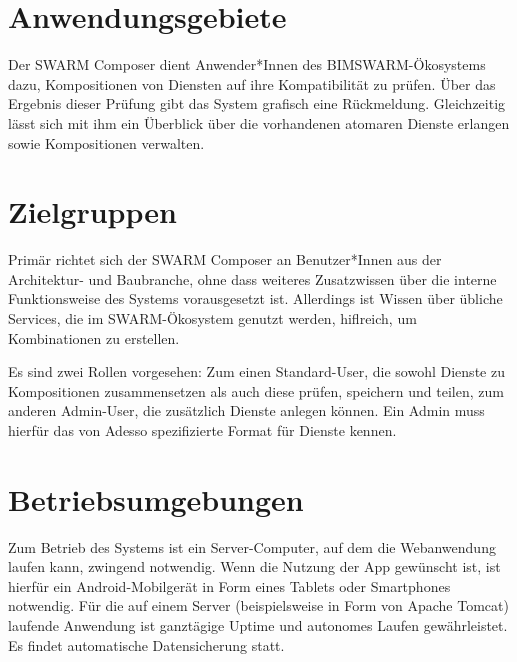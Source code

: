 \section*{Anwendungsgebiete}
Der SWARM Composer dient Anwender*Innen des BIMSWARM-Ökosystems dazu, Kompositionen von Diensten auf ihre Kompatibilität zu prüfen. Über das Ergebnis dieser Prüfung gibt das System grafisch eine Rückmeldung. Gleichzeitig lässt sich mit ihm ein Überblick über die vorhandenen atomaren Dienste erlangen sowie Kompositionen verwalten. 

\section*{Zielgruppen}

Primär richtet sich der SWARM Composer an Benutzer*Innen aus der Architektur- und Baubranche, ohne dass weiteres Zusatzwissen über die interne Funktionsweise des Systems vorausgesetzt ist. Allerdings ist Wissen über übliche Services, die im SWARM-Ökosystem genutzt werden, hiflreich, um Kombinationen zu erstellen.

Es sind zwei Rollen vorgesehen: Zum einen Standard-User, die sowohl Dienste zu Kompositionen zusammensetzen als auch diese prüfen, speichern und teilen, zum anderen Admin-User, die zusätzlich Dienste anlegen können. Ein Admin muss hierfür das von Adesso spezifizierte Format für Dienste kennen.

\section*{Betriebsumgebungen}

Zum Betrieb des Systems ist ein Server-Computer, auf dem die Webanwendung laufen kann, zwingend notwendig. Wenn die Nutzung der App gewünscht ist, ist hierfür ein Android-Mobilgerät in Form eines Tablets oder Smartphones notwendig. Für die auf einem Server (beispielsweise in Form von Apache Tomcat) laufende Anwendung ist ganztägige Uptime und autonomes Laufen gewährleistet. Es findet automatische Datensicherung statt.




